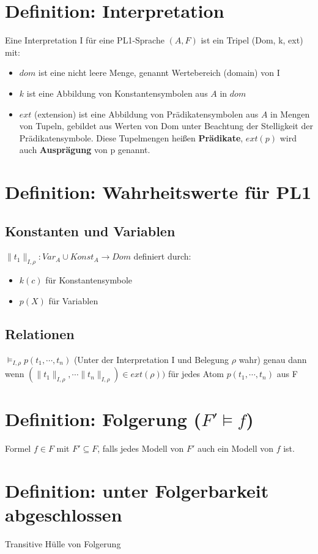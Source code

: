\documentclass[12pt, a4paper]{article}
\begin{document}
\section*{Definition: Interpretation}
Eine Interpretation I für eine PL1-Sprache $(A,F)$ ist ein Tripel (Dom, k, ext) mit:
\begin{itemize}
\item $dom$ ist eine nicht leere Menge, genannt Wertebereich (domain) von I
\item $k$ ist eine Abbildung von Konstantensymbolen aus $A$ in $dom$
\item $ext$ (extension) ist eine Abbildung von Prädikatensymbolen aus $A$ in Mengen von Tupeln, gebildet aus Werten von Dom unter Beachtung der Stelligkeit der Prädikatensymbole. Diese Tupelmengen heißen \textbf{Prädikate}, $ext(p)$ wird auch \textbf{Ausprägung} von p genannt.
\end{itemize}

\section*{Definition: Wahrheitswerte für PL1}
\subsection*{Konstanten und Variablen}
$\parallel t_1 \parallel_{I, \rho}: Var_A \cup Konst_A \rightarrow Dom$ definiert durch: 
\begin{itemize}
\item $k(c)$ für Konstantensymbole
\item $p(X)$ für Variablen
\end{itemize}

\subsection*{Relationen}
$\models_{I,\rho} p(t_1, \cdots, t_n)$ (Unter der Interpretation I und Belegung $\rho$ wahr) genau dann wenn $(\parallel t_1 \parallel_{I, \rho}, \cdots \parallel t_n \parallel_{I, \rho}) \in ext(\rho))$ für jedes Atom $p(t_1, \cdots, t_n)$ aus F

\section*{Definition: Folgerung ($F' \models f$)}
Formel $f \in F$ mit $F' \subseteq F$, falls jedes Modell von $F'$ auch ein Modell von $f$ ist.

\section*{Definition: unter Folgerbarkeit abgeschlossen}
Transitive Hülle von Folgerung
\end{document}

